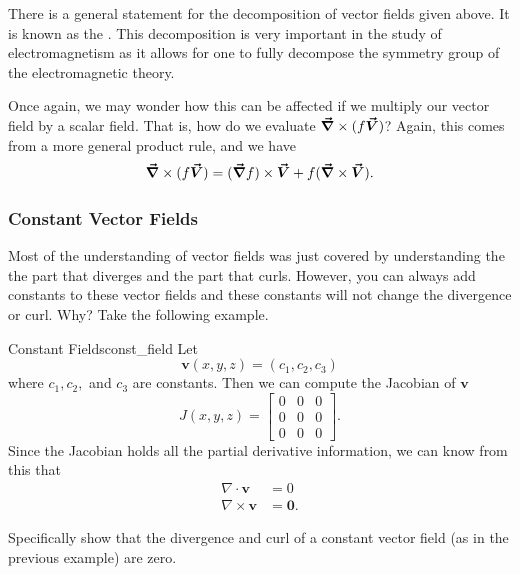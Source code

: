 		        \begin{remark}
		        	There is a general statement for the decomposition of vector fields given above.  It is known as the .  This decomposition is very important in the study of electromagnetism as it allows for one to fully decompose the symmetry group of the electromagnetic theory.
		        			        \end{remark}
		        			        
		       Once again, we may wonder how this can be affected if we multiply our vector field by a scalar field.  That is, how do we evaluate $\boldsymbol{\vec{\nabla}} \times (f\boldsymbol{\vec{V}})$?  Again, this comes from a more general product rule, and we have
		       \[
		       \boldsymbol{\vec{\nabla}} \times (f \boldsymbol{\vec{V}}) = (\boldsymbol{\vec{\nabla}} f)\times \boldsymbol{\vec{V}} + f (\boldsymbol{\vec{\nabla}} \times \boldsymbol{\vec{V}}).
		       \]
		        
		        \subsubsection{Constant Vector Fields}
		        Most of the understanding of vector fields was just covered by understanding the the part that diverges and the part that curls.  However, you can always add constants to these vector fields and these constants will not change the divergence or curl. Why? Take the following example.
		        
		        \begin{ex}{Constant Fields}{const_field}
		        Let 
		        \[
		        \mathbf{v}(x,y,z) = (c_1,c_2,c_3)
		        \]
		        where $c_1,c_2,$ and $c_3$ are constants.  Then we can compute the Jacobian of $\mathbf{v}$
		        \[
		        J(x,y,z) = \begin{bmatrix} 0 & 0 & 0 \\ 0 & 0 & 0\\ 0 & 0 &0 \end{bmatrix}.
		        \]
		        Since the Jacobian holds all the partial derivative information, we can know from this that 
		        \begin{align*}
		            \nabla \cdot \mathbf{v} &= 0\\
		            \nabla \times \mathbf{v} &= \mathbf{0}.
		        \end{align*}
		        \end{ex}
		        
		        \begin{exercise}
		        Specifically show that the divergence and curl of a constant vector field (as in the previous example) are zero.  
		        \end{exercise}
		        
